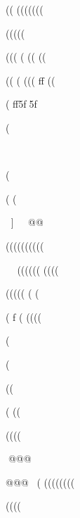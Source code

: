 ((     (((((((


(((((

(((   (  (( ((


(( (       (((   ff  
((

( ff5f5f  

(










(   



   (   (



]
@@


((((((((((










((((((
((((



(((((  (     (

(        f   (
((((    

(








(




((





(  ((



((((


@@@




















@@@(
((((((((





















((((






